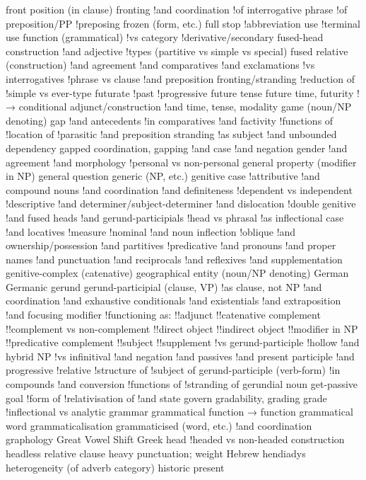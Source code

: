 front position (in clause)
fronting
!and coordination
!of interrogative phrase
!of preposition/PP
!preposing
frozen (form, etc.)
full stop
!abbreviation use
!terminal use
function (grammatical)
!vs category
!derivative/secondary
fused-head construction
!and adjective
!types (partitive vs simple vs special)
fused relative (construction)
!and agreement
!and comparatives
!and exclamations
!vs interrogatives
!phrase vs clause
!and preposition fronting/stranding
!reduction of
!simple vs ever-type
futurate
!past
!progressive
future tense
future time, futurity
!→ conditional adjunct/construction
!and time, tense, modality
game (noun/NP denoting)
gap
!and antecedents
!in comparatives
!and factivity
!functions of
!location of
!parasitic
!and preposition stranding
!as subject
!and unbounded dependency
gapped coordination, gapping
!and case
!and negation
gender
!and agreement
!and morphology
!personal vs non-personal
general property (modifier in NP)
general question
generic (NP, etc.)
genitive case
!attributive
!and compound nouns
!and coordination
!and definiteness
!dependent vs independent
!descriptive
!and determiner/subject-determiner
!and dislocation
!double genitive
!and fused heads
!and gerund-participials
!head vs phrasal
!as inflectional case
!and locatives
!measure
!nominal
!and noun inflection
!oblique
!and ownership/possession
!and partitives
!predicative
!and pronouns
!and proper names
!and punctuation
!and reciprocals
!and reflexives
!and supplementation
genitive-complex (catenative)
geographical entity (noun/NP denoting)
German
Germanic
gerund
gerund-participial (clause, VP)
!as clause, not NP
!and coordination
!and exhaustive conditionals
!and existentials
!and extraposition
!and focusing modifier
!functioning as:
!!adjunct
!!catenative complement
!!complement vs non-complement
!!direct object
!!indirect object
!!modifier in NP
!!predicative complement
!!subject
!!supplement
!vs gerund-participle
!hollow
!and hybrid NP
!vs infinitival
!and negation
!and passives
!and present participle
!and progressive
!relative
!structure of
!subject of
gerund-participle (verb-form)
!in compounds
!and conversion
!functions of
!stranding of
gerundial noun
get-passive
goal
!form of
!relativisation of
!and state
govern
gradability, grading
grade
!inflectional vs analytic
grammar
grammatical function → function
grammatical word
grammaticalisation
grammaticised (word, etc.)
!and coordination
graphology
Great Vowel Shift
Greek
head
!headed vs non-headed construction
headless relative clause
heavy punctuation; weight
Hebrew
hendiadys
heterogeneity (of adverb category)
historic present

